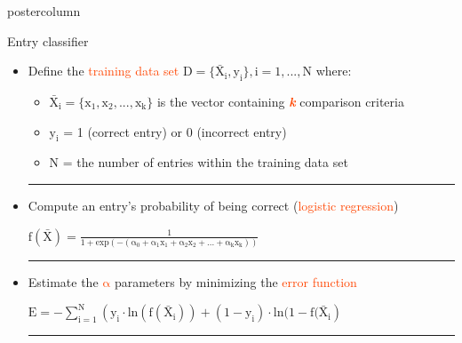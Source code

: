 \documentclass[final,hyperref={pdfpagelabels=false}]{beamer}
\newlength{\columnheight}
\begin{document}
\begin{frame}
\begin{columns}
    \begin{column}{.33\textwidth}
      \begin{beamercolorbox}[center,wd=\textwidth]{postercolumn}
        \begin{minipage}[T]{.95\textwidth}
          \parbox[t][\columnheight]{\textwidth}{

            \begin{block}{Entry classifier}
              \begin{itemize}
		\item Define the \textcolor{OrangeRed}{training data set} $\mathrm{D=\{\bar{X}_{i}, y_{i}\}, i=1,...,N}$ where:
			\begin{center}
			\begin{itemize}
			\item $\mathrm{\bar{X}_{i} = \{x_1, x_2,..., x_k\}}$ is the vector containing \textcolor{OrangeRed}{\textbf{\textit{k}}} comparison criteria
			\item $\mathrm{y_i}$ = 1 (correct entry) or 0 (incorrect entry)
			\item $\mathrm{N}$ = the number of entries within the training data set
			\end{itemize}
			\end{center}
		\textcolor{ta3skyblue}{\rule[0.1ex]{0.95\textwidth}{1.6pt}}

               	\item Compute an entry's probability of being correct (\textcolor{OrangeRed}{logistic regression})\\
               		\begin{center} $\mathrm{f(\bar{X})=\frac{1}{1+exp(-(\alpha _{0}+\alpha _{1}x_{1}+\alpha _{2}x_{2}+...+\alpha _{k}x_{k}))}}$ \end{center}
		\textcolor{ta3skyblue}{\rule[0.1ex]{0.95\textwidth}{1.6pt}}

               	\item Estimate the \textcolor{OrangeRed}{$\mathrm{\alpha}$} parameters by minimizing the \textcolor{OrangeRed}{error function}
			\begin{center} $\mathrm{E=-\sum_{i=1}^{N}\left ( y_i\cdot ln(f(\bar{X}_i))+(1-y_i)\cdot ln(1-f(\bar{X}_i \right )}$ \end{center}
		\textcolor{ta3skyblue}{\rule[0.1ex]{0.95\textwidth}{1.6pt}}


\end{itemize}
\end{block}}
\end{minipage}
\end{beamercolorbox}
\end{column}
\end{columns}
\end{frame}
\end{document}
